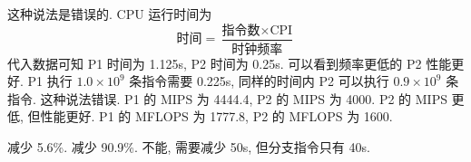 \documentclass[11pt]{homework}
\begin{document}
\question
\begin{arabicparts}
    \questionpart 这种说法是错误的. CPU 运行时间为
    \begin{equation}
        \text{时间} = \frac{\text{指令数}\times \text{CPI}}{\text{时钟频率}}
    \end{equation}
    代入数据可知 P1 时间为 1.125s, P2 时间为 0.25s. 可以看到频率更低的 P2 性能更好.
    \questionpart
    P1 执行 $1.0\times 10^9$ 条指令需要 0.225s, 同样的时间内 P2 可以执行 $0.9\times 10^9$ 条指令.
    \questionpart 
    这种说法错误. P1 的 MIPS 为 4444.4, P2 的 MIPS 为 4000. P2 的 MIPS 更低, 但性能更好.
    \questionpart
    P1 的 MFLOPS 为 1777.8, P2 的 MFLOPS 为 1600.
\end{arabicparts}
\question
\begin{arabicparts}
    \questionpart 减少 5.6\%.
    \questionpart 减少 90.9\%.
    \questionpart 不能, 需要减少 50s, 但分支指令只有 40s.
\end{arabicparts}
\end{document}
